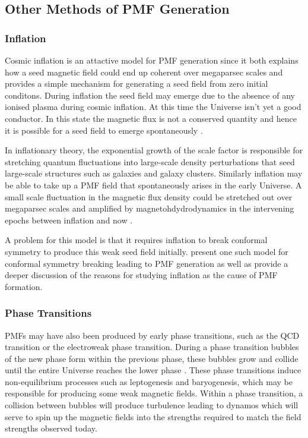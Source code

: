 \subsection{Other Methods of PMF Generation}

\subsubsection{Inflation}
Cosmic inflation is an attactive model for PMF generation since it both explains how a seed magnetic field could end up coherent over megaparsec scales and provides a simple mechanism for generating a seed field from zero initial conditons. During inflation the seed field may emerge due to the absence of any ionised plasma during cosmic inflation. At this time the Universe isn't yet a good conductor. In this state the magnetic flux is not a conserved quantity and hence it is possible for a seed field to emerge spontaneously \cite{PhysRevD.37.2743}.

In inflationary theory, the exponential growth of the scale factor is responsible for stretching quantum fluctuations into large-scale density perturbations that seed large-scale structures such as galaxies and galaxy clusters. Similarly inflation may be able to take up a PMF field that spontaneously arises in the early Universe. A small scale fluctuation in the magnetic flux density could be stretched out over megaparsec scales and amplified by magnetohdydrodynamics in the intervening epochs between inflation and now \cite{PhysRevD.37.2743}.

A problem for this model is that it requires inflation to break conformal symmetry to produce this weak seed field initially. \cite{PhysRevD.37.2743} present one such model for conformal symmetry breaking leading to PMF generation as well as provide a deeper discussion of the reasons for studying inflation as the cause of PMF formation.
\\
\subsubsection{Phase Transitions}
PMFs may have also been produced by early phase transitions, such as the QCD transition or the electroweak phase transition. During a phase transition bubbles of the new phase form within the previous phase, these bubbles grow and collide until the entire Universe reaches the lower phase \cite{Yamazaki:2012pg}. These phase transitions induce  non-equilibrium processes such as leptogenesis and baryogenesis, which may be responsible for producing some weak magnetic fields. Within a phase transition, a collision between bubbles will produce turbulence leading to dynamos which will serve to spin up the magnetic fields into the strengths required to match the field strengths observed today.

